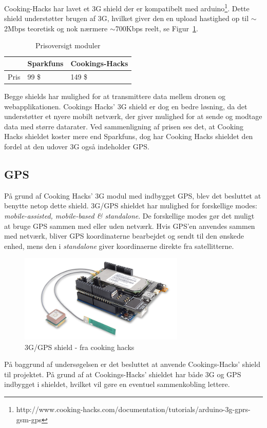 Cooking-Hacks har lavet et 3G shield der er kompatibelt med arduino\footnote{http://www.cooking-hacks.com/documentation/tutorials/arduino-3g-gprs-gsm-gps}. Dette shield understøtter brugen af 3G, hvilket giver den en upload hastighed op til $\sim$2Mbps teoretisk og nok nærmere $\sim$700Kbps reelt, se Figur~\ref{fig:3gtable}.

\begin{table}[H]
	\centering
		\begin{tabular}{|p{3.5cm}|p{5 cm}|p{5 cm}|} 
		\hline
			\textbf{ } & \textbf{Sparkfuns} 	& \textbf{Cookings-Hacks} \\ \hline
					Pris& 99 \$  & 149 \$ \\ \hline			 					 			
		\end{tabular}
	\caption{Prisoversigt moduler}
\end{table}

\newpage

Begge shields har mulighed for at transmittere data mellem dronen og webapplikationen. Cookings Hacks' 3G shield er dog en bedre løsning, da det understøtter et nyere mobilt netværk, der giver mulighed for at sende og modtage data med større datarater.
Ved sammenligning af prisen ses det, at Cooking Hacks shieldet koster mere end Sparkfuns, dog har Cooking Hacks shieldet den fordel at den udover 3G også indeholder GPS.

\subsection{GPS}
På grund af Cooking Hacks' 3G modul med indbygget GPS, blev det besluttet at benytte netop dette shield. 3G/GPS shieldet har mulighed for forskellige modes: \textit{mobile-assisted, mobile-based \& standalone}. De forskellige modes gør det muligt at bruge GPS sammen med eller uden netværk. \newline 
Hvis GPS'en anvendes sammen med netværk, bliver GPS koordinaterne bearbejdet og sendt til den ønskede enhed, mens den i \textit{standalone} giver koordinaerne direkte fra satellitterne.

\begin{figure}[H]
\centering
\includegraphics[width=0.7\textwidth]{Billeder/3G.png}
\caption{3G/GPS shield - fra cooking hacks}
\label{fig:3gtable}
\end{figure}


På baggrund af undersøgelsen er det besluttet at anvende Cookings-Hacks' shield til projektet. På grund af at Cookings-Hacks' shieldet har både 3G og GPS indbygget i shieldet, hvilket vil gøre en eventuel sammenkobling lettere.